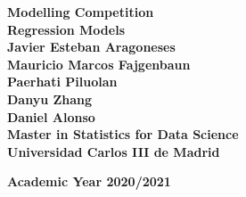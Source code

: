\documentclass[a4paper,12pt]{article}
\begin{document}
	
		\begin{titlepage}
		\begin{center}
		\textbf{\LARGE Modelling Competition}\\[0.65 cm]
		\textbf{\LARGE Regression Models}\\[4 cm]
		
        \textbf{\normalsize Javier Esteban Aragoneses}\\[0.1 cm]
		\textbf{\normalsize Mauricio Marcos Fajgenbaun}\\[0.1 cm]
		\textbf{\normalsize Paerhati Piluolan}\\[0.1 cm]
		\textbf{\normalsize Danyu Zhang}\\[0.1 cm]
		\textbf{\normalsize Daniel Alonso}\\[2.5 cm]
		\textbf{\large Master in Statistics for Data Science}\\[0.5 cm]
        \textbf{\large Universidad Carlos III de Madrid}\\[1.5 cm]
        \begin{figure}[H]
		    \centering
		\end{figure}
		\textbf{Academic Year 2020/2021}    
		\end{center}
	    \end{titlepage} 
\end{document}
